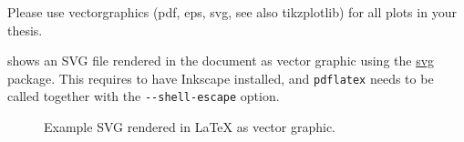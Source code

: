 Please use vectorgraphics (pdf, eps, svg, see also tikzplotlib) for all plots in your thesis.  


 shows an SVG file rendered in the document as vector graphic using the \href{https://ctan.org/pkg/svg?lang=en}{svg} package.
This requires to have Inkscape installed, and \texttt{pdflatex} needs to be called together with the \texttt{-{}-shell-escape} option.

\begin{figure}[ht!]
    \centering
    \caption{Example SVG rendered in \LaTeX{} as vector graphic.}
    \label{fig:svgexample}
\end{figure}

